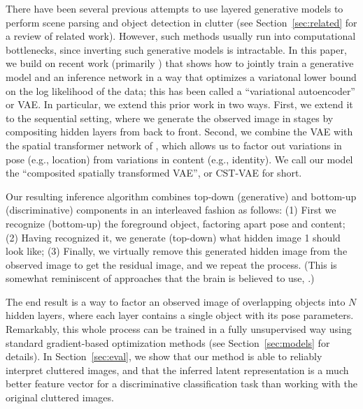 There have been several previous attempts to use layered generative
models to perform scene parsing and object detection in clutter (see
Section~\ref{sec:related} for a review of related work). However, such
methods usually run into computational bottlenecks, since inverting
such generative models is intractable.
In this paper, we build on recent work (primarily \cite{Kingma2014,gregor2015draw})
that shows how to jointly train a generative model and an inference
network in a way that optimizes a variatonal lower bound on the log
likelihood of the data;
this has been called a ``variational autoencoder'' or VAE.
In particular, we extend this prior work in
two ways. First, we extend it to the sequential setting, where we
generate the observed image in stages by compositing hidden layers
from back to front.
Second, we combine the VAE with the spatial transformer network of
\citep{jaderberg2015spatial}, which allows us to factor out variations
in pose (e.g., location) from variations in content (e.g., identity).
We call our model the ``composited spatially transformed VAE'', or CST-VAE
for short.

Our resulting inference algorithm combines top-down (generative)
and bottom-up (discriminative) components in an interleaved fashion as follows:
(1)  First we recognize (bottom-up) the foreground object, factoring apart pose and content;
(2) Having recognized it, we generate (top-down) what hidden image 1 should look
like;
(3) Finally, we virtually remove this generated hidden image from the observed
image to get the residual image, and we repeat the process.
(This is somewhat reminiscent of approaches that the brain is believed
to use, \cite{Hochstein2002}.)

The end result is a way to factor an observed image of
overlapping objects into $N$
hidden layers, where each layer contains a single object
with its pose parameters.
Remarkably, this whole process can be trained in a fully unsupervised
way using standard gradient-based optimization methods
(see Section~\ref{sec:models} for details).
In Section~\ref{sec:eval}, we show that our method is able to reliably
interpret cluttered images, and that the inferred latent
representation is a much better  feature vector for a discriminative
classification task than working with the original cluttered images.




